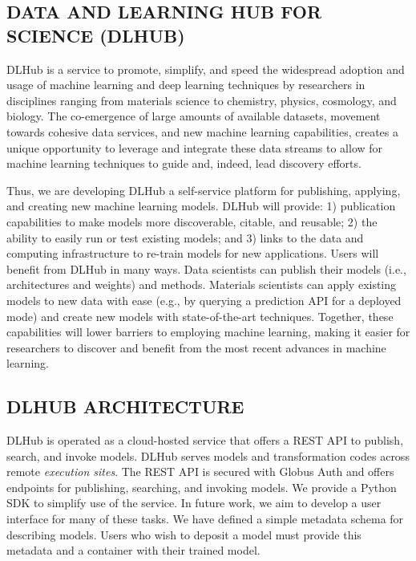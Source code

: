 \documentclass{aip-cp}
\begin{document}


\subsection{DATA AND LEARNING HUB FOR SCIENCE (DLHUB)}
 
DLHub is a service to promote, simplify, and speed the widespread adoption and
usage of machine learning and deep learning techniques by researchers in
disciplines ranging from materials science to chemistry, physics, cosmology,
and biology. The co-emergence of large amounts of available datasets, movement
towards cohesive data services, and new machine learning capabilities, creates
a unique opportunity to leverage and integrate these data streams to allow for
machine learning techniques to guide and, indeed, lead discovery efforts.
 
Thus, we are developing DLHub a self-service platform for publishing,
applying, and creating new machine learning models. DLHub
will provide: 1) publication capabilities to make models more discoverable,
citable, and reusable; 2) the ability to easily run or test existing models;
and 3) links to the data and computing infrastructure to re-train models for
new applications. Users will benefit from DLHub in many ways. Data scientists
can publish their models (i.e., architectures and weights) and methods.
Materials scientists can apply existing models to new data with ease (e.g., by
querying a prediction API for a deployed mode) and create new models with
state-of-the-art techniques. Together, these capabilities will lower barriers
to employing machine learning, making it easier for researchers to discover
and benefit from the most recent advances in machine learning.

\subsection{DLHUB ARCHITECTURE} 

DLHub is operated as a cloud-hosted service that offers a REST API to
publish, search, and invoke models. DLHub serves models and transformation
codes across remote \textit{execution sites}.  The REST API is secured with
Globus Auth \cite{tuecke2016globus} and offers endpoints for publishing, searching, and invoking
models. We provide a Python SDK to simplify use of the service. In future
work, we aim to develop a user interface for many of these tasks.  We have defined a
simple metadata schema for describing models.  Users who wish to deposit a
model must provide this metadata and a container with their trained model.
 
\end{document}

